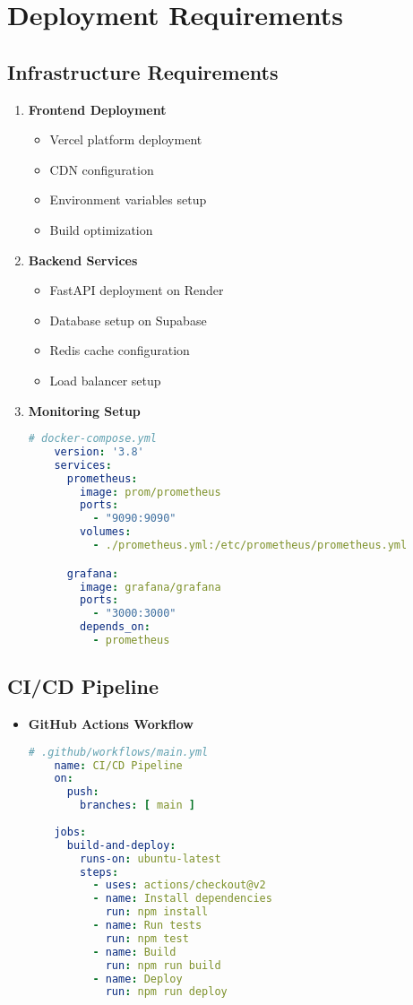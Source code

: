 \section{Deployment Requirements}
\subsection{Infrastructure Requirements}
\begin{enumerate}
    \item \textbf{Frontend Deployment}
    \begin{itemize}
        \item Vercel platform deployment
        \item CDN configuration
        \item Environment variables setup
        \item Build optimization
    \end{itemize}

    \item \textbf{Backend Services}
    \begin{itemize}
        \item FastAPI deployment on Render
        \item Database setup on Supabase
        \item Redis cache configuration
        \item Load balancer setup
    \end{itemize}

    \item \textbf{Monitoring Setup}
    \begin{lstlisting}[language=yaml]
    # docker-compose.yml
    version: '3.8'
    services:
      prometheus:
        image: prom/prometheus
        ports:
          - "9090:9090"
        volumes:
          - ./prometheus.yml:/etc/prometheus/prometheus.yml

      grafana:
        image: grafana/grafana
        ports:
          - "3000:3000"
        depends_on:
          - prometheus
    \end{lstlisting}
\end{enumerate}

\subsection{CI/CD Pipeline}
\begin{itemize}
    \item \textbf{GitHub Actions Workflow}
    \begin{lstlisting}[language=yaml]
    # .github/workflows/main.yml
    name: CI/CD Pipeline
    on:
      push:
        branches: [ main ]
    
    jobs:
      build-and-deploy:
        runs-on: ubuntu-latest
        steps:
          - uses: actions/checkout@v2
          - name: Install dependencies
            run: npm install
          - name: Run tests
            run: npm test
          - name: Build
            run: npm run build
          - name: Deploy
            run: npm run deploy
    \end{lstlisting}
\end{itemize} 